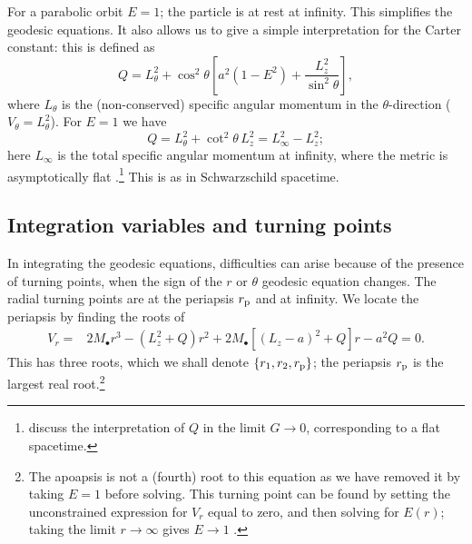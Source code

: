 For a parabolic orbit $E = 1$; the particle is at rest at infinity. This simplifies the geodesic equations. It also allows us to give a simple interpretation for the Carter constant: this is defined as
\begin{equation}
Q = L_\theta^2 + \cos^2\theta\left[a^2\left(1 - E^2\right) + \dfrac{L_z^2}{\sin^2\theta}\right],
\end{equation}
where $L_\theta$ is the (non-conserved) specific angular momentum in the $\theta$-direction ($V_\theta = L_\theta^2$). For $E = 1$ we have
\begin{equation}
Q = L_\theta^2 + \cot^2\theta\, L_z^2 = L_\infty^2 - L_z^2;
\end{equation}
here $L_\infty$ is the total specific angular momentum at infinity, where the metric is asymptotically flat \citep{DeFelice1980}.\footnote{\citet{Rosquist2009} discuss the interpretation of $Q$ in the limit $G \rightarrow 0$, corresponding to a flat spacetime.} This is as in Schwarzschild spacetime.

\subsection{Integration variables and turning points}

In integrating the geodesic equations, difficulties can arise because of the presence of turning points, when the sign of the $r$ or $\theta$ geodesic equation changes. The radial turning points are at the periapsis $r_\mathrm{p}$ and at infinity. We locate the periapsis by finding the roots of
\begin{align}
V_r = {} & 2M_\bullet r^3 - \left(L_z^2+Q\right)r^2 + 2M_\bullet\left[\left(L_z - a\right)^2 + Q\right]r - a^2 Q = {} 0.
\end{align}
This has three roots, which we shall denote $\{r_1, r_2, r_\mathrm{p}\}$; the periapsis $r_\mathrm{p}$ is the largest real root.\footnote{The apoapsis is not a (fourth) root to this equation as we have removed it by taking $E = 1$ before solving. This turning point can be found by setting the unconstrained expression for $V_r$ equal to zero, and then solving for $E(r)$; taking the limit $r \rightarrow \infty$ gives $E \rightarrow 1$ \citep{Wilkins1972}.}

